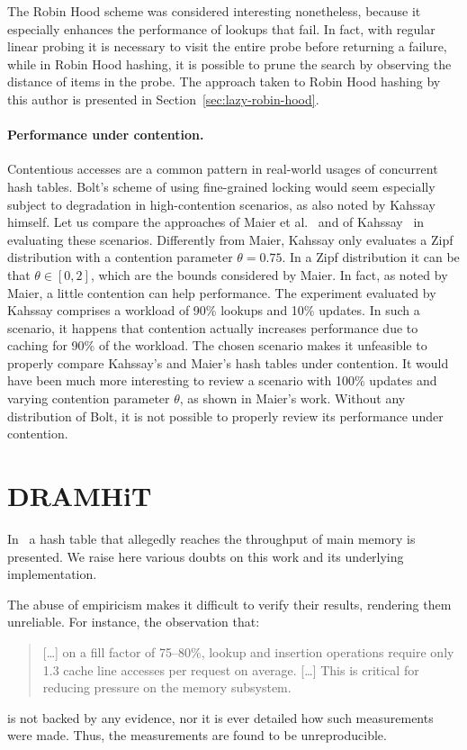 The Robin Hood scheme was considered interesting nonetheless, because it especially enhances the performance of lookups that fail.
In fact, with regular linear probing it is necessary to visit the entire probe before returning a failure, while in Robin Hood hashing, it is possible to prune the search by observing the distance of items in the probe.
The approach taken to Robin Hood hashing by this author is presented in Section~\ref{sec:lazy-robin-hood}.

\paragraph{Performance under contention.}
Contentious accesses are a common pattern in real-world usages of concurrent hash tables.
Bolt's scheme of using fine-grained locking would seem especially subject to degradation in high-contention scenarios, as also noted by Kahssay himself.
Let us compare the approaches of Maier et al.\ \cite[\S8.4, ``Performance under contention'']{maier} and of Kahssay~\cite[\S7.4]{bolt} in evaluating these scenarios.
Differently from Maier, Kahssay only evaluates a Zipf distribution with a contention parameter $\theta = 0.75$.
In a Zipf distribution it can be that $\theta \in [0, 2]$, which are the bounds considered by Maier.
In fact, as noted by Maier, a little contention can help performance.
The experiment evaluated by Kahssay comprises a workload of 90\% lookups and 10\% updates.
In such a scenario, it happens that contention actually increases performance due to caching for 90\% of the workload.
The chosen scenario makes it unfeasible to properly compare Kahssay's and Maier's hash tables under contention.
It would have been much more interesting to review a scenario with 100\% updates and varying contention parameter $\theta$, as shown in Maier's work.
Without any distribution of Bolt, it is not possible to properly review its performance under contention.


\section{DRAMHiT}\label{sec:dramhit}

In~\cite{dramhit} a hash table that allegedly reaches the throughput of main memory is presented.
We raise here various doubts on this work and its underlying implementation.

The abuse of empiricism makes it difficult to verify their results, rendering them unreliable.
For instance, the observation that:
\begin{quote}
	[\ldots] on a fill factor of 75--80\%, lookup and insertion operations require only 1.3 cache line accesses per request on average.
	[\ldots] This is critical for reducing pressure on the memory subsystem.
\end{quote}
is not backed by any evidence, nor it is ever detailed how such measurements were made.
Thus, the measurements are found to be unreproducible.

